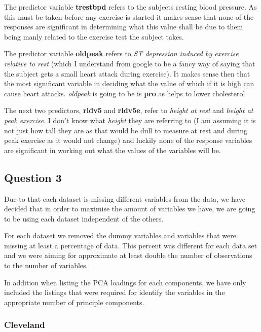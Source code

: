 \documentclass[a4paper]{article}
\begin{document}
\newpage

The predictor variable \textbf{trestbpd} refers to the subjects resting blood
pressure. As this must be taken before any exercise is started it makes sense
that none of the responses are significant in determining what this value shall
be due to them being manly related to the exercise test the subject takes.

\newpage

The predictor variable \textbf{oldpeak} refers to \textit{ST depression induced
by exercise relative to rest} (which I understand from google to be a fancy way
of saying that the subject gets a small heart attack during exercise). It makes
sense then that the most significant variable in deciding what the value of
which if it is high can cause heart attacks.
\textit{oldpeak} is going to be is \textbf{pro} as helps to lower cholesterol

\newpage
The next two predictors, \textbf{rldv5} and \textbf{rldv5e}, refer to
\textit{height at rest} and \textit{height at peak exercise}. I don't know what
\textit{height} they are referring to (I am assuming it is not just how tall
they are as that would be dull to measure at rest and during peak exercise as it
would not change) and luckily none of the response variables are significant in
working out what the values of the variables will be.



\newpage
\subsection{Question 3}

Due to that each dataset is missing different variables from the data, we have decided that in order to maximise the amount of variables we have, we are going to be using each dataset independent of the others. 

For each dataset we removed the dummy variables and variables that were missing at least a percentage of data. This percent was different for each data set and we were aiming for approximate at least double the number of observations to the number of variables. 

In addition when listing the PCA loadings for each components, we have only included the listings that were required for identify the variables in the appropriate number of principle components. 

\subsubsection{Cleveland}
\end{document}
